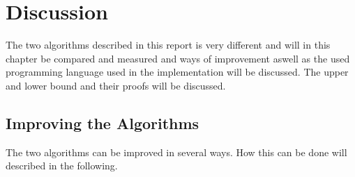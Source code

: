 \chapter{Discussion}
\emptyTop{}
The two algorithms described in this report is very different and will in this chapter be compared and measured and ways of improvement aswell as the used programming language used in the implementation will be discussed. 
The upper and lower bound and their proofs will be discussed. 




\section{Improving the Algorithms}
The two algorithms can be improved in several ways. How this can be done will described in the following. 



